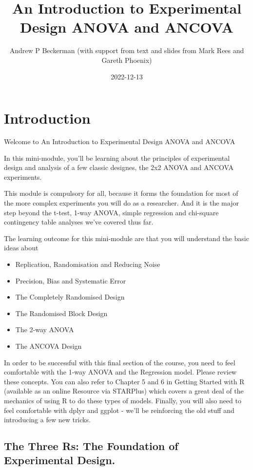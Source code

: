 \documentclass[
]{book}
\title{An Introduction to Experimental Design ANOVA and ANCOVA}
\author{Andrew P Beckerman (with support from text and slides from Mark Rees and Gareth Phoenix)}
\date{2022-12-13}
\providecommand{\tightlist}{%
  \setlength{\itemsep}{0pt}\setlength{\parskip}{0pt}}
\begin{document}
\maketitle

{
\setcounter{tocdepth}{1}
\tableofcontents
}
\hypertarget{introduction}{%
\chapter{Introduction}\label{introduction}}

Welcome to An Introduction to Experimental Design ANOVA and ANCOVA

In this mini-module, you'll be learning about the principles of experimental design and analysis of a few classic designes, the 2x2 ANOVA and ANCOVA experiments.

This module is compulsory for all, because it forms the foundation for most of the more complex experiments you will do as a researcher. And it is the major step beyond the t-test, 1-way ANOVA, simple regression and chi-square contingency table analyses we've covered thus far.

The learning outcome for this mini-module are that you will understand the basic ideas about

\begin{itemize}
\tightlist
\item
  Replication, Randomisation and Reducing Noise
\item
  Precision, Bias and Systematic Error
\item
  The Completely Randomised Design
\item
  The Randomised Block Design
\item
  The 2-way ANOVA
\item
  The ANCOVA Design
\end{itemize}

In order to be successful with this final section of the course, you need to feel comfortable with the 1-way ANOVA and the Regression model. Please review these concepts. You can also refer to Chapter 5 and 6 in Getting Started with R (available as an online Resource via STARPlus) which covers a great deal of the mechanics of using R to do these types of models. Finally, you will also need to feel comfortable with dplyr and ggplot - we'll be reinforcing the old stuff and introducing a few new tricks.

\hypertarget{the-three-rs-the-foundation-of-experimental-design.}{%
\section{The Three Rs: The Foundation of Experimental Design.}\label{the-three-rs-the-foundation-of-experimental-design.}}
\end{document}
